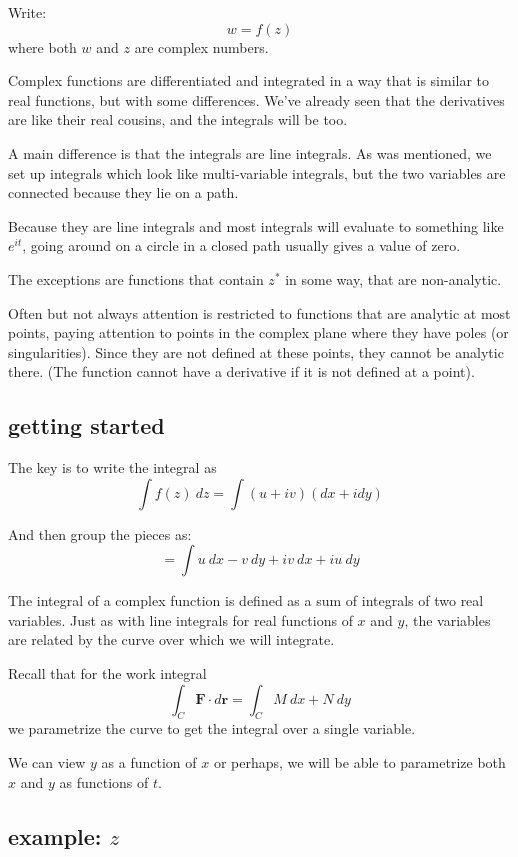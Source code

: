 \documentclass[11pt, oneside]{article}
\begin{document}
Write:
\[ w = f(z) \]
where both $w$ and $z$ are complex numbers.

Complex functions are differentiated and integrated in a way that is similar to real functions, but with some differences.  We've already seen that the derivatives are like their real cousins, and the integrals will be too.

A main difference is that the integrals are line integrals.  As was mentioned, we set up integrals which look like multi-variable integrals, but the two variables are connected because they lie on a path.  

Because they are line integrals and most integrals will evaluate to something like $e^{it}$, going around on a circle in a closed path usually gives a value of zero.

The exceptions are functions that contain $z^*$ in some way, that are non-analytic.

Often but not always attention is restricted to functions that are analytic at most points, paying attention to points in the complex plane where they have poles (or singularities).  Since they are not defined at these points, they cannot be analytic there.  (The function cannot have a derivative if it is not defined at a point).

\subsection*{getting started}

The key is to write the integral as
 \[ \int f(z) \ dz = \int (u + i v) (dx + i dy) \]
 
And then group the pieces as:
\[ = \int u \ dx - v \ dy + iv \ dx + iu \ dy \]

The integral of a complex function is defined as a sum of integrals of two real variables.  Just as with line integrals for real functions of $x$ and $y$, the variables are related by the curve over which we will integrate.

Recall that for the work integral
\[ \int_C \mathbf{F} \cdot d \mathbf{r} = \int_C M \ dx + N \ dy \]
we parametrize the curve to get the integral over a single variable.

We can view $y$ as a function of $x$ or perhaps, we will be able to parametrize both $x$ and $y$ as functions of $t$.

\subsection*{example: $z$}
\end{document}
